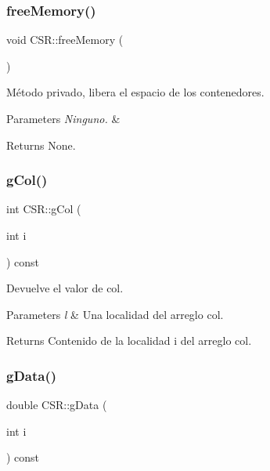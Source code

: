 \subsubsection{\texorpdfstring{free\+Memory()}{freeMemory()}}
{\footnotesize\ttfamily void C\+S\+R\+::free\+Memory (\begin{DoxyParamCaption}{ }\end{DoxyParamCaption})}



Método privado, libera el espacio de los contenedores. 


\begin{DoxyParams}{Parameters}
{\em Ninguno.} & \\
\hline
\end{DoxyParams}
\begin{DoxyReturn}{Returns}
None. 
\end{DoxyReturn}
\hypertarget{class_c_s_r_a5056fbfaf6281aa5c724800ee57b2fe7}{}\label{class_c_s_r_a5056fbfaf6281aa5c724800ee57b2fe7} 
\subsubsection{\texorpdfstring{g\+Col()}{gCol()}}
{\footnotesize\ttfamily int C\+S\+R\+::g\+Col (\begin{DoxyParamCaption}\item[{int}]{i }\end{DoxyParamCaption}) const\hspace{0.3cm}{\ttfamily [inline]}}



Devuelve el valor de col. 


\begin{DoxyParams}{Parameters}
{\em l} & Una localidad del arreglo col. \\
\hline
\end{DoxyParams}
\begin{DoxyReturn}{Returns}
Contenido de la localidad i del arreglo col. 
\end{DoxyReturn}
\hypertarget{class_c_s_r_a5cce7eedb969cd75345adf06e448bd64}{}\label{class_c_s_r_a5cce7eedb969cd75345adf06e448bd64} 
\subsubsection{\texorpdfstring{g\+Data()}{gData()}}
{\footnotesize\ttfamily double C\+S\+R\+::g\+Data (\begin{DoxyParamCaption}\item[{int}]{i }\end{DoxyParamCaption}) const\hspace{0.3cm}{\ttfamily [inline]}}



